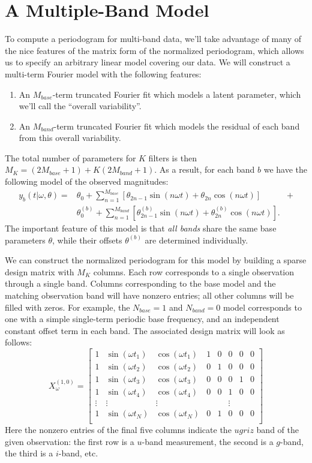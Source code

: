 \documentclass[12pt,preprint]{aastex}
\begin{document}
\section{A Multiple-Band Model}
To compute a periodogram for multi-band data, we'll take advantage of many of the nice features of the matrix form of the normalized periodogram, which allows us to specify an arbitrary linear model covering our data. We will construct a multi-term Fourier model with the following features:
\begin{enumerate}
  \item An $M_{base}$-term truncated Fourier fit which models a latent parameter, which we'll call the ``overall variability''.
  \item An $M_{band}$-term truncated Fourier fit which models the residual of each band from this overall variability.
\end{enumerate}
The total number of parameters for $K$ filters is then $M_K = (2M_{base} + 1) + K(2M_{band} + 1)$. As a result, for each band $b$ we have the following model of the observed magnitudes:
\begin{eqnarray}
  y_b(t|\omega,\theta) = &\theta_0 + \sum_{n=1}^{M_{base}} \left[\theta_{2n - 1}\sin(n\omega t) + \theta_{2n}\cos(n\omega t)\right]& +\\ 
  &\theta^{(b)}_0 + \sum_{n=1}^{M_{band}} \left[\theta^{(b)}_{2n - 1}\sin(n\omega t) + \theta^{(b)}_{2n}\cos(n\omega t)\right].&
\end{eqnarray}
The important feature of this model is that {\it all bands} share the same base parameters $\theta$, while their offsets $\theta^{(b)}$ are determined individually.

We can construct the normalized periodogram for this model by building a sparse design matrix with $M_K$ columns. Each row corresponds to a single observation through a single band. Columns corresponding to the base model and the matching observation band will have nonzero entries; all other columns will be filled with zeros. For example, the $N_{base}=1$ and $N_{band}=0$ model corresponds to one with a simple single-term periodic base frequency, and an independent constant offset term in each band. The associated design matrix will look as follows:
\begin{equation}
X_\omega^{(1,0)} = \left[
\begin{array}{cccccccc}
1 & \sin(\omega t_1) & \cos(\omega t_1) & 1 & 0 & 0 & 0 & 0\\
1 & \sin(\omega t_2) & \cos(\omega t_2) & 0 & 1 & 0 & 0 & 0\\
1 & \sin(\omega t_3) & \cos(\omega t_3) & 0 & 0 & 0 & 1 & 0\\
1 & \sin(\omega t_4) & \cos(\omega t_4) & 0 & 0 & 1 & 0 & 0\\
\vdots & \vdots & \vdots & & & \vdots & &\\
1 & \sin(\omega t_N) & \cos(\omega t_N) & 0 & 1 & 0 & 0 & 0\\
\end{array}
\right]
\end{equation}
Here the nonzero entries of the final five columns indicate the $ugriz$ band of the given observation: the first row is a $u$-band measurement, the second is a $g$-band, the third is a $i$-band, etc.
\end{document}
